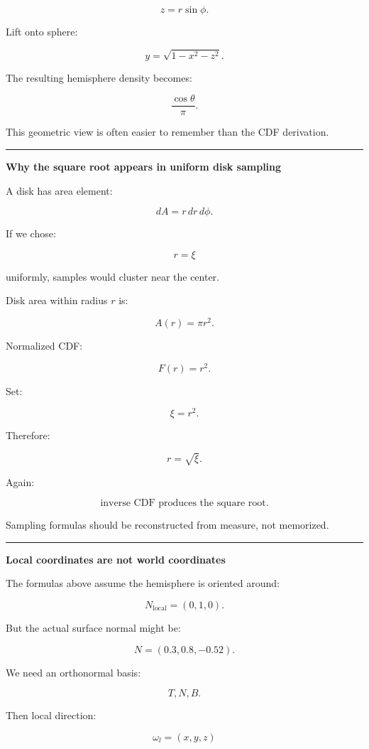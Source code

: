 \[
z=r\sin\phi.
\]

Lift onto sphere:

\[
y=\sqrt{1-x^2-z^2}.
\]

The resulting hemisphere density becomes:

\[
\frac{\cos\theta}{\pi}.
\]

This geometric view is often easier to remember than the CDF derivation.

\begin{center}\rule{0.5\linewidth}{0.5pt}\end{center}

\textbf{Why the square root appears in uniform disk sampling}

A disk has area element:

\[
dA=r\,dr\,d\phi.
\]

If we chose:

\[
r=\xi
\]

uniformly, samples would cluster near the center.

Disk area within radius \(r\) is:

\[
A(r)=\pi r^2.
\]

Normalized CDF:

\[
F(r)=r^2.
\]

Set:

\[
\xi=r^2.
\]

Therefore:

\[
\boxed{
r=\sqrt{\xi}.
}
\]

Again:

\[
\boxed{
\text{inverse CDF produces the square root.}
}
\]

Sampling formulas should be reconstructed from measure, not memorized.

\begin{center}\rule{0.5\linewidth}{0.5pt}\end{center}

\textbf{Local coordinates are not world coordinates}

The formulas above assume the hemisphere is oriented around:

\[
N_{\text{local}}=(0,1,0).
\]

But the actual surface normal might be:

\[
N=(0.3,0.8,-0.52).
\]

We need an orthonormal basis:

\[
T,
N,
B.
\]

Then local direction:

\[
\omega_l=(x,y,z)
\]

